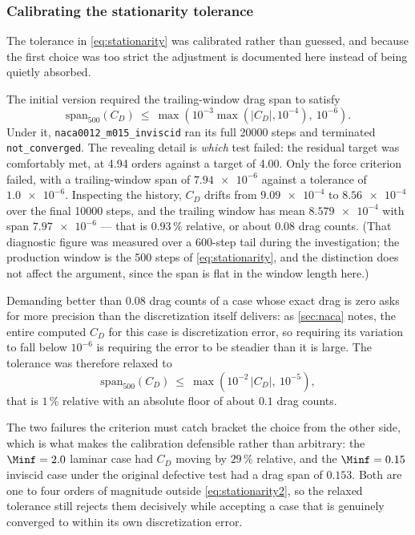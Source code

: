 \subsubsection{Calibrating the stationarity tolerance}
\label{sec:tolerance}

The tolerance in \cref{eq:stationarity} was calibrated rather than guessed, and
because the first choice was too strict the adjustment is documented here instead
of being quietly absorbed.

The initial version required the trailing-window drag span to satisfy
\begin{equation*}
  \mathrm{span}_{500}(C_D)\ \le\
  \max\!\left(10^{-3}\max\left(|C_D|,10^{-4}\right),\ 10^{-6}\right).
\end{equation*}
Under it,
\texttt{naca0012\_m015\_inviscid} ran its full \num{20000} steps and terminated
\texttt{not\_converged}. The revealing detail is \emph{which} test failed: the
residual target was comfortably met, at 4.94 orders against a target of 4.00. Only
the force criterion failed, with a trailing-window span of $\num{7.94e-6}$ against
a tolerance of $\num{1.0e-6}$. Inspecting the history, $C_D$ drifts from
$\num{9.09e-4}$ to $\num{8.56e-4}$ over the final \num{10000} steps, and the
trailing window has mean $\num{8.579e-4}$ with span $\num{7.97e-6}$ --- that is
$0.93\,\%$ relative, or about $0.08$ drag counts. (That diagnostic figure was
measured over a 600-step tail during the investigation; the production window is
the 500 steps of \cref{eq:stationarity}, and the distinction does not affect the
argument, since the span is flat in the window length here.)

Demanding better than $0.08$ drag counts of a case whose exact drag is zero asks
for more precision than the discretization itself delivers: as
\cref{sec:naca} notes, the entire computed $C_D$ for this case is discretization
error, so requiring its variation to fall below $10^{-6}$ is requiring the error
to be steadier than it is large. The tolerance was therefore relaxed to
\begin{equation}
  \mathrm{span}_{500}(C_D)\ \le\ \max\!\left(10^{-2}\,|C_D|,\ 10^{-5}\right),
  \label{eq:stationarity2}
\end{equation}
that is $1\,\%$ relative with an absolute floor of about $0.1$ drag counts.

The two failures the criterion must catch bracket the choice from the other side,
which is what makes the calibration defensible rather than arbitrary: the
$\Minf=2.0$ laminar case had $C_D$ moving by $29\,\%$ relative, and the
$\Minf=0.15$ inviscid case under the original defective test had a drag span of
$0.153$. Both are one to four orders of magnitude outside \cref{eq:stationarity2},
so the relaxed tolerance still rejects them decisively while accepting a case
that is genuinely converged to within its own discretization error.

